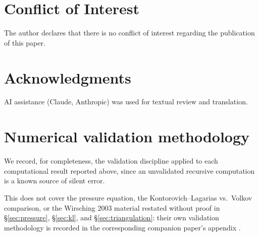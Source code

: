 \documentclass[11pt]{article}
\theoremstyle{definition}
\theoremstyle{remark}
\begin{document}
\section*{Conflict of Interest}

The author declares that there is no conflict of interest regarding
the publication of this paper.

\section*{Acknowledgments}

AI assistance (Claude, Anthropic) was used for textual review and
translation.

\appendix

\section{Numerical validation methodology}
\label{app:validation}

We record, for completeness, the validation discipline applied to each
computational result reported above, since an unvalidated recursive
computation is a known source of silent error.

This does not cover the pressure equation, the Kontorovich--Lagarias
vs.\ Volkov comparison, or the Wirsching 2003 material restated
without proof in \S\ref{sec:pressure}, \S\ref{sec:kl}, and
\S\ref{sec:triangulation}: their own validation methodology is
recorded in the corresponding companion paper's appendix
\cite{PressureCompanion,KLVolkovCompanion,WirschingCompanion}.
\end{document}

